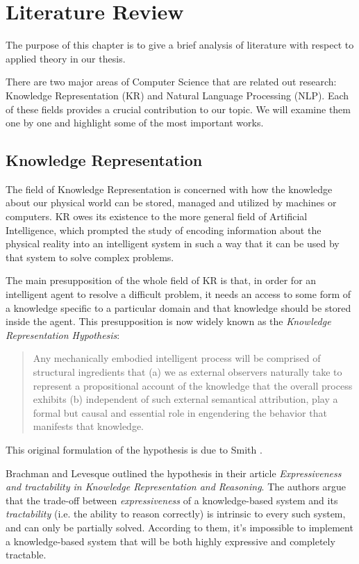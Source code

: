 \chapter{Literature Review}
\label{chap:lr}
The purpose of this chapter is to give a brief analysis of literature with respect to applied theory in our thesis.

There are two major areas of Computer Science that are related out research: Knowledge Representation (KR) and Natural Language
Processing (NLP). Each of these fields provides a crucial contribution to our topic.  We will examine them one by one and
highlight some of the most important works.

\section{Knowledge Representation}
The field of Knowledge Representation is concerned with how the knowledge about our physical world can be stored, managed and
utilized by machines or computers.
KR owes its existence to the more general field of Artificial Intelligence, which prompted the study of encoding information about
the physical reality into an intelligent system in such a way that it can be used by that system to solve complex problems.

The main presupposition of the whole field of KR is that, in order for an intelligent agent to resolve a difficult problem, it
needs an access to some form of a knowledge specific to a particular domain and that knowledge should be stored inside the agent.
This presupposition is now widely known as the \textit{Knowledge Representation Hypothesis}:
\begin{quote}
    Any mechanically embodied intelligent process will be comprised of structural ingredients that (a) we as external observers
    naturally take to represent a propositional account of the knowledge that the overall process exhibits (b) independent of such
    external semantical attribution, play a formal but causal and essential role in engendering the behavior that manifests that
    knowledge.
\end{quote}
This original formulation of the hypothesis is due to Smith \cite{smithyp}.

Brachman and Levesque outlined the hypothesis in their article \textit{Expressiveness and tractability in Knowledge Representation
and Reasoning}\cite{krhyp}. The authors argue that the trade-off between \textit{expressiveness} of a knowledge-based system and
its \textit{tractability} (i.e. the ability to reason correctly) is intrinsic to every such system, and can only be partially
solved.  According to them, it's impossible to implement a knowledge-based system that will be both highly expressive and
completely tractable.

